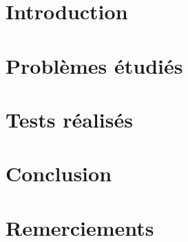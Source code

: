 \documentclass{report}
\newcommand{\blankpage}{\newpage \thispagestyle{empty} \addtocounter{page}{-1} \null \newpage}
\begin{document}
  
  \tableofcontents
  \setlength{\parskip}{10pt}
  \setlength{\parindent}{0pt}

  \chapter{Introduction}
    
  
  \chapter{Problèmes étudiés}
    
  
  \chapter{Tests réalisés}
    
  
  \chapter{Conclusion}
    
  
  \chapter*{Remerciements}
  \listoffigures
  \listoftables
\end{document}

